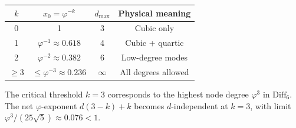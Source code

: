 \begin{center}
\begin{tabular}{|c|c|c|c|}
\hline
$k$ & $x_0 = \varphi^{-k}$ & $d_{\max}$ & Physical meaning \\
\hline
0 & 1 & 3 & Cubic only \\
1 & $\varphi^{-1} \approx 0.618$ & 4 & Cubic + quartic \\
2 & $\varphi^{-2} \approx 0.382$ & 6 & Low-degree modes \\
$\geq 3$ & $\leq \varphi^{-3} \approx 0.236$ & $\infty$ & All degrees allowed \\
\hline
\end{tabular}
\end{center}

The critical threshold $k = 3$ corresponds to the highest node degree $\varphi^3$ in $\mathrm{Diff}_6$.
The net $\varphi$-exponent $d(3-k) + k$ becomes $d$-independent at $k = 3$,
with limit $\varphi^3/(25\sqrt{5}) \approx 0.076 < 1$.
